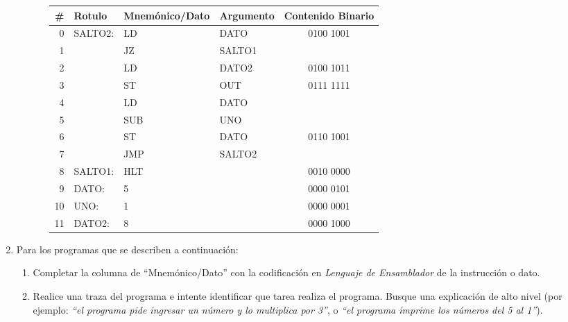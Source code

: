 \documentclass[12pt]{article}
\begin{document}
\begin{enumerate}
\begin{enumerate}
\begin{enumerate}
\begin{tabular}{|r||l|l|l||c|}
                    \hline

                    \textbf{\#} & \textbf{Rotulo} & \textbf{Mnemónico/Dato} &
                    \textbf{Argumento} & \textbf{Contenido Binario}\\
                    \hline
                    \hline

                    0 & SALTO2: & LD & DATO & 0100 1001\\ \hline
                    1 & & JZ & SALTO1 & \\ \hline
                    2 & & LD & DATO2 & 0100 1011\\ \hline
                    3 & & ST & OUT & 0111 1111\\ \hline
                    4 & & LD & DATO & \\ \hline
                    5 & & SUB & UNO & \\ \hline
                    6 & & ST & DATO & 0110 1001\\ \hline
                    7 & & JMP & SALTO2 & \\ \hline
                    8 & SALTO1: & HLT & & 0010 0000\\ \hline
                    9 & DATO: & 5 & & 0000 0101\\ \hline
                    10 & UNO: & 1 & & 0000 0001\\ \hline
                    11 & DATO2: & 8 & & 0000 1000\\ \hline

                \end{tabular}

            \end{enumerate}
        \end{enumerate}

    \item Para los programas que se describen a continuación:

        \begin{enumerate}

            \item Completar la columna de ``Mnemónico/Dato'' con la
                codificación en \emph{Lenguaje de Ensamblador} de la
                instrucción o dato.

            \item Realice una traza del programa e intente identificar que
                tarea realiza el programa. Busque una explicación de alto
                nivel (por ejemplo: \emph{``el programa pide ingresar un número y lo
                multiplica por 3''}, o \emph{``el programa imprime los números del 5
                al 1''}).


\end{enumerate}
\end{enumerate}
\end{document}
